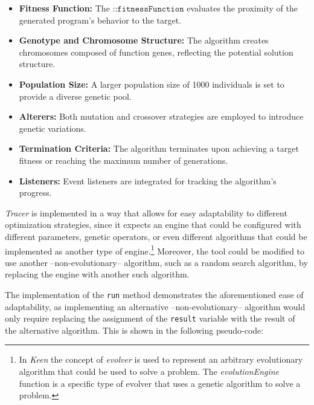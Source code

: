         \begin{itemize}
            \item \textbf{Fitness Function:} The \(\texttt{::fitnessFunction}\) evaluates the proximity of the generated 
                program's behavior to the target.
            \item \textbf{Genotype and Chromosome Structure:} The algorithm creates chromosomes composed of function
                genes, reflecting the potential solution structure.
            \item \textbf{Population Size:} A larger population size of 1000 individuals is set to provide a diverse
                genetic pool.
            \item \textbf{Alterers:} Both mutation and crossover strategies are employed to introduce genetic 
                variations.
            \item \textbf{Termination Criteria:} The algorithm terminates upon achieving a target fitness or reaching
                the maximum number of generations.
            \item \textbf{Listeners:} Event listeners are integrated for tracking the algorithm's progress.
        \end{itemize}
    
        \textit{Tracer} is implemented in a way that allows for easy adaptability to different optimization strategies,
        since it expects an engine that could be configured with different parameters, genetic operators, or even
        different algorithms that could be implemented as another type of engine.\footnote{
            In \textit{Keen} the concept of \textit{evolver} is used to represent an arbitrary evolutionary algorithm 
            that could be used to solve a problem. The \textit{evolutionEngine} function is a specific type of evolver 
            that uses a genetic algorithm to solve a problem.
        } Moreover, the tool could be modified to use another --non-evolutionary-- algorithm, such as a random search
        algorithm, by replacing the engine with another such algorithm.

        The implementation of the \texttt{run} method demonstrates the aforementioned ease of adaptability, as 
        implementing an alternative --non-evolutionary-- algorithm would only require replacing the assignment of the
        \texttt{result} variable with the result of the alternative algorithm. This is shown in the following 
        pseudo-code:

